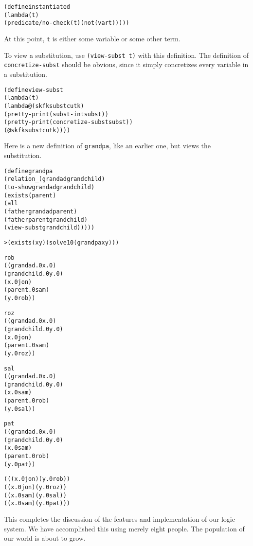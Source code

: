 \begin{alltt}
(define instantiated
  (lambda (t)
    (predicate/no-check (t) (not (var t)))))
\end{alltt}

\noindent
At this point, \texttt{t} is either some variable or some other term.

To view a substitution, use \texttt{(view-subst t)} with this
definition.  The definition of \texttt{concretize-subst} should
be obvious, since it simply concretizes every variable in
a substitution.

\begin{alltt}
(define view-subst
  (lambda (t)
    (lambda@ (sk fk subst cutk)
      (pretty-print (subst-in t subst))
      (pretty-print (concretize-subst subst))
      (@ sk fk subst cutk))))
\end{alltt}

Here is a new definition of \texttt{grandpa}, like an earlier one,
but views the substitution.

\begin{alltt}
(define grandpa
  (relation _ (grandad grandchild)
    (to-show grandad grandchild)
    (exists (parent)
      (all
        (father grandad parent)
        (father parent grandchild)
        (view-subst grandchild)))))
\end{alltt}

\begin{alltt}
> (exists (x y) (solve 10 (grandpa x y)))

rob
((grandad.0 x.0)
 (grandchild.0 y.0)
 (x.0 jon)
 (parent.0 sam)
 (y.0 rob))
\end{alltt}

\begin{alltt}
roz
((grandad.0 x.0)
 (grandchild.0 y.0)
 (x.0 jon)
 (parent.0 sam)
 (y.0 roz))
\end{alltt}

\begin{alltt}
sal
((grandad.0 x.0)
 (grandchild.0 y.0)
 (x.0 sam)
 (parent.0 rob)
 (y.0 sal))

pat
((grandad.0 x.0)
 (grandchild.0 y.0)
 (x.0 sam)
 (parent.0 rob)
 (y.0 pat))

(((x.0 jon) (y.0 rob))
 ((x.0 jon) (y.0 roz))
 ((x.0 sam) (y.0 sal))
 ((x.0 sam) (y.0 pat)))
\end{alltt}

This completes the discussion of the features and implementation of
our logic system.  We have accomplished this using merely eight
people.  The population of our world is about to grow.

